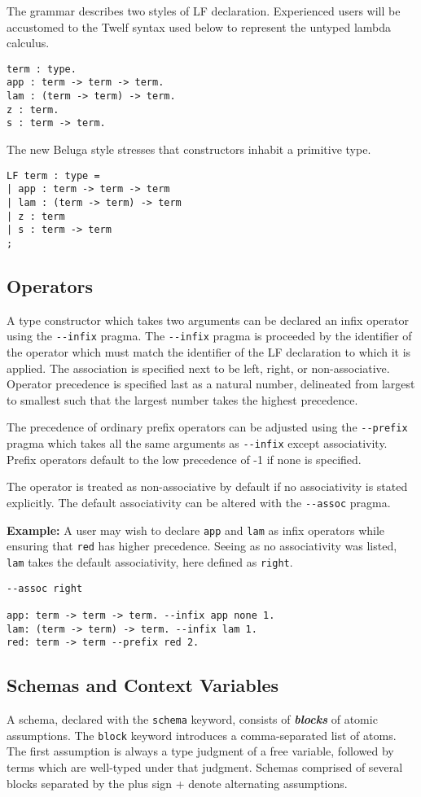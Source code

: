 \documentclass[11pt]{article}
\begin{document}
The grammar describes two styles of LF declaration.
Experienced users will be accustomed to the Twelf syntax used below to represent the untyped lambda calculus.
\begin{verbatim}
term : type.
app : term -> term -> term.
lam : (term -> term) -> term.
z : term.
s : term -> term.
\end{verbatim}

The new Beluga style stresses that constructors inhabit a primitive type.
\begin{verbatim}
LF term : type =
| app : term -> term -> term
| lam : (term -> term) -> term
| z : term
| s : term -> term
;
\end{verbatim}

\subsection{Operators}
A type constructor which takes two arguments can be declared an infix operator using the \verb+--infix+ pragma.
The \verb+--infix+ pragma is proceeded by the identifier of the operator which must match the identifier of the LF declaration to which it is applied.
The association is specified next to be left, right, or non-associative.
Operator precedence is specified last as a natural number, delineated from largest to smallest such that the largest number takes the highest precedence.

The precedence of ordinary prefix operators can be adjusted using the \verb+--prefix+ pragma which takes all the same arguments as \verb+--infix+ except associativity.
Prefix operators default to the low precedence of -1 if none is specified.

The operator is treated as non-associative by default if no associativity is stated explicitly.
The default associativity can be altered with the \verb+--assoc+ pragma.

\textbf{Example:} A user may wish to declare \verb+app+ and \verb+lam+ as infix operators while ensuring that \verb+red+ has higher precedence.
Seeing as no associativity was listed, \verb+lam+ takes the default associativity, here defined as \verb+right+.
\begin{verbatim}
--assoc right

app: term -> term -> term. --infix app none 1.
lam: (term -> term) -> term. --infix lam 1.
red: term -> term --prefix red 2.
\end{verbatim}

\subsection{Schemas and Context Variables}
A schema, declared with the \verb+schema+ keyword, consists of \textbf{\textit{blocks}} of atomic assumptions.
The \verb+block+ keyword introduces a comma-separated list of atoms.
The first assumption is always a type judgment of a free variable, followed by terms which are well-typed under that judgment.
Schemas comprised of several blocks separated by the plus sign \verb+++ denote alternating assumptions.
\end{document}
